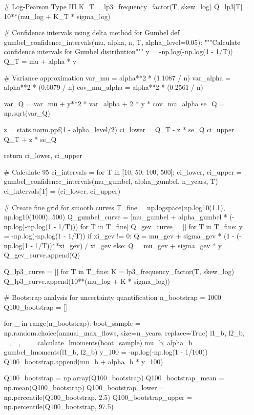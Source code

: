\documentclass[a4paper, 11pt]{article}
\begin{document}
\begin{pycode}
    # Log-Pearson Type III
    K_T = lp3_frequency_factor(T, skew_log)
    Q_lp3[T] = 10**(mu_log + K_T * sigma_log)

# Confidence intervals using delta method for Gumbel
def gumbel_confidence_intervals(mu, alpha, n, T, alpha_level=0.05):
    """Calculate confidence intervals for Gumbel distribution"""
    y = -np.log(-np.log(1 - 1/T))
    Q_T = mu + alpha * y

    # Variance approximation
    var_mu = alpha**2 * (1.1087 / n)
    var_alpha = alpha**2 * (0.6079 / n)
    cov_mu_alpha = alpha**2 * (0.2561 / n)

    var_Q = var_mu + y**2 * var_alpha + 2 * y * cov_mu_alpha
    se_Q = np.sqrt(var_Q)

    z = stats.norm.ppf(1 - alpha_level/2)
    ci_lower = Q_T - z * se_Q
    ci_upper = Q_T + z * se_Q

    return ci_lower, ci_upper

# Calculate 95%
ci_intervals = {}
for T in [10, 50, 100, 500]:
    ci_lower, ci_upper = gumbel_confidence_intervals(mu_gumbel, alpha_gumbel, n_years, T)
    ci_intervals[T] = (ci_lower, ci_upper)

# Create fine grid for smooth curves
T_fine = np.logspace(np.log10(1.1), np.log10(1000), 500)
Q_gumbel_curve = [mu_gumbel + alpha_gumbel * (-np.log(-np.log(1 - 1/T))) for T in T_fine]
Q_gev_curve = []
for T in T_fine:
    y = -np.log(-np.log(1 - 1/T))
    if xi_gev != 0:
        Q = mu_gev + sigma_gev * (1 - (-np.log(1 - 1/T))**xi_gev) / xi_gev
    else:
        Q = mu_gev + sigma_gev * y
    Q_gev_curve.append(Q)

Q_lp3_curve = []
for T in T_fine:
    K = lp3_frequency_factor(T, skew_log)
    Q_lp3_curve.append(10**(mu_log + K * sigma_log))

# Bootstrap analysis for uncertainty quantification
n_bootstrap = 1000
Q100_bootstrap = []

for _ in range(n_bootstrap):
    boot_sample = np.random.choice(annual_max_flows, size=n_years, replace=True)
    l1_b, l2_b, _, _, _ = calculate_lmoments(boot_sample)
    mu_b, alpha_b = gumbel_lmoments(l1_b, l2_b)
    y_100 = -np.log(-np.log(1 - 1/100))
    Q100_bootstrap.append(mu_b + alpha_b * y_100)

Q100_bootstrap = np.array(Q100_bootstrap)
Q100_bootstrap_mean = np.mean(Q100_bootstrap)
Q100_bootstrap_lower = np.percentile(Q100_bootstrap, 2.5)
Q100_bootstrap_upper = np.percentile(Q100_bootstrap, 97.5)


\end{pycode}
\end{document}
